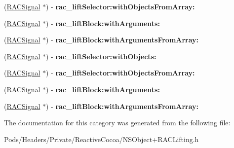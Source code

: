 \begin{DoxyCompactItemize}
\item 
\mbox{\label{category_n_s_object_07_r_a_c_lifting_deprecated_08_ac21b362d041bcad70936c45e83d0ccde}} 
(\mbox{\hyperlink{interface_r_a_c_signal}{R\+A\+C\+Signal}} $\ast$) -\/ {\bfseries rac\+\_\+lift\+Selector\+:with\+Objects\+From\+Array\+:}
\item 
\mbox{\label{category_n_s_object_07_r_a_c_lifting_deprecated_08_a62c7adb4ffbffc9b46a62351fbe1790b}} 
(\mbox{\hyperlink{interface_r_a_c_signal}{R\+A\+C\+Signal}} $\ast$) -\/ {\bfseries rac\+\_\+lift\+Block\+:with\+Arguments\+:}
\item 
\mbox{\label{category_n_s_object_07_r_a_c_lifting_deprecated_08_a9052f65a819271d2738828ad32d9e1d1}} 
(\mbox{\hyperlink{interface_r_a_c_signal}{R\+A\+C\+Signal}} $\ast$) -\/ {\bfseries rac\+\_\+lift\+Block\+:with\+Arguments\+From\+Array\+:}
\item 
\mbox{\label{category_n_s_object_07_r_a_c_lifting_deprecated_08_abeb79ac20a04b7094a6d2047716dd13b}} 
(\mbox{\hyperlink{interface_r_a_c_signal}{R\+A\+C\+Signal}} $\ast$) -\/ {\bfseries rac\+\_\+lift\+Selector\+:with\+Objects\+:}
\item 
\mbox{\label{category_n_s_object_07_r_a_c_lifting_deprecated_08_ac21b362d041bcad70936c45e83d0ccde}} 
(\mbox{\hyperlink{interface_r_a_c_signal}{R\+A\+C\+Signal}} $\ast$) -\/ {\bfseries rac\+\_\+lift\+Selector\+:with\+Objects\+From\+Array\+:}
\item 
\mbox{\label{category_n_s_object_07_r_a_c_lifting_deprecated_08_a62c7adb4ffbffc9b46a62351fbe1790b}} 
(\mbox{\hyperlink{interface_r_a_c_signal}{R\+A\+C\+Signal}} $\ast$) -\/ {\bfseries rac\+\_\+lift\+Block\+:with\+Arguments\+:}
\item 
\mbox{\label{category_n_s_object_07_r_a_c_lifting_deprecated_08_a9052f65a819271d2738828ad32d9e1d1}} 
(\mbox{\hyperlink{interface_r_a_c_signal}{R\+A\+C\+Signal}} $\ast$) -\/ {\bfseries rac\+\_\+lift\+Block\+:with\+Arguments\+From\+Array\+:}
\end{DoxyCompactItemize}


The documentation for this category was generated from the following file\+:\begin{DoxyCompactItemize}
\item 
Pods/\+Headers/\+Private/\+Reactive\+Cocoa/N\+S\+Object+\+R\+A\+C\+Lifting.\+h\end{DoxyCompactItemize}
